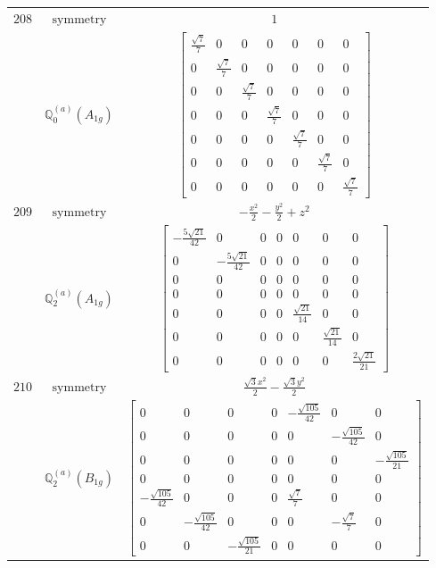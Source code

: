 \documentclass[fleqn,8pt,landscape]{jsarticle}
\begin{document}
\begin{longtable}{ccc}
$ 208 $ & $ \text{symmetry} $ & $ 1 $ \\
$  $ & $ \mathbb{Q}_{0}^{(a)}(A_{1g}) $ & $ \begin{bmatrix} \frac{\sqrt{7}}{7} & 0 & 0 & 0 & 0 & 0 & 0 \\ 0 & \frac{\sqrt{7}}{7} & 0 & 0 & 0 & 0 & 0 \\ 0 & 0 & \frac{\sqrt{7}}{7} & 0 & 0 & 0 & 0 \\ 0 & 0 & 0 & \frac{\sqrt{7}}{7} & 0 & 0 & 0 \\ 0 & 0 & 0 & 0 & \frac{\sqrt{7}}{7} & 0 & 0 \\ 0 & 0 & 0 & 0 & 0 & \frac{\sqrt{7}}{7} & 0 \\ 0 & 0 & 0 & 0 & 0 & 0 & \frac{\sqrt{7}}{7} \end{bmatrix} $ \\ \hline
$ 209 $ & $ \text{symmetry} $ & $ - \frac{x^{2}}{2} - \frac{y^{2}}{2} + z^{2} $ \\
$  $ & $ \mathbb{Q}_{2}^{(a)}(A_{1g}) $ & $ \begin{bmatrix} - \frac{5 \sqrt{21}}{42} & 0 & 0 & 0 & 0 & 0 & 0 \\ 0 & - \frac{5 \sqrt{21}}{42} & 0 & 0 & 0 & 0 & 0 \\ 0 & 0 & 0 & 0 & 0 & 0 & 0 \\ 0 & 0 & 0 & 0 & 0 & 0 & 0 \\ 0 & 0 & 0 & 0 & \frac{\sqrt{21}}{14} & 0 & 0 \\ 0 & 0 & 0 & 0 & 0 & \frac{\sqrt{21}}{14} & 0 \\ 0 & 0 & 0 & 0 & 0 & 0 & \frac{2 \sqrt{21}}{21} \end{bmatrix} $ \\ \hline
$ 210 $ & $ \text{symmetry} $ & $ \frac{\sqrt{3} x^{2}}{2} - \frac{\sqrt{3} y^{2}}{2} $ \\
$  $ & $ \mathbb{Q}_{2}^{(a)}(B_{1g}) $ & $ \begin{bmatrix} 0 & 0 & 0 & 0 & - \frac{\sqrt{105}}{42} & 0 & 0 \\ 0 & 0 & 0 & 0 & 0 & - \frac{\sqrt{105}}{42} & 0 \\ 0 & 0 & 0 & 0 & 0 & 0 & - \frac{\sqrt{105}}{21} \\ 0 & 0 & 0 & 0 & 0 & 0 & 0 \\ - \frac{\sqrt{105}}{42} & 0 & 0 & 0 & \frac{\sqrt{7}}{7} & 0 & 0 \\ 0 & - \frac{\sqrt{105}}{42} & 0 & 0 & 0 & - \frac{\sqrt{7}}{7} & 0 \\ 0 & 0 & - \frac{\sqrt{105}}{21} & 0 & 0 & 0 & 0 \end{bmatrix} $ \\ \hline

\end{longtable}
\end{document}
